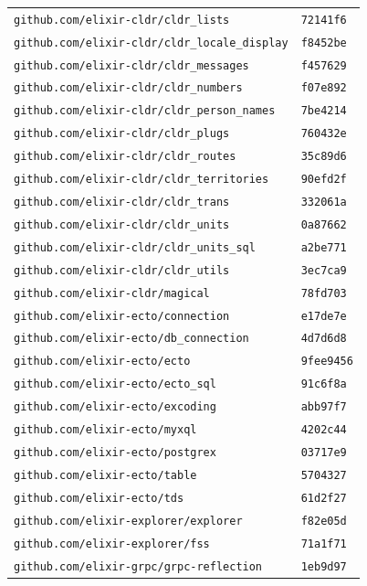 \begin{longtable}{@{}p{} l@{}}
\texttt{github.com/elixir-cldr/cldr\_lists} & \texttt{72141f6} \\
\texttt{github.com/elixir-cldr/cldr\_locale\_display} & \texttt{f8452be} \\
\texttt{github.com/elixir-cldr/cldr\_messages} & \texttt{f457629} \\
\texttt{github.com/elixir-cldr/cldr\_numbers} & \texttt{f07e892} \\
\texttt{github.com/elixir-cldr/cldr\_person\_names} & \texttt{7be4214} \\
\texttt{github.com/elixir-cldr/cldr\_plugs} & \texttt{760432e} \\
\texttt{github.com/elixir-cldr/cldr\_routes} & \texttt{35c89d6} \\
\texttt{github.com/elixir-cldr/cldr\_territories} & \texttt{90efd2f} \\
\texttt{github.com/elixir-cldr/cldr\_trans} & \texttt{332061a} \\
\texttt{github.com/elixir-cldr/cldr\_units} & \texttt{0a87662} \\
\texttt{github.com/elixir-cldr/cldr\_units\_sql} & \texttt{a2be771} \\
\texttt{github.com/elixir-cldr/cldr\_utils} & \texttt{3ec7ca9} \\
\texttt{github.com/elixir-cldr/magical} & \texttt{78fd703} \\
\texttt{github.com/elixir-ecto/connection} & \texttt{e17de7e} \\
\texttt{github.com/elixir-ecto/db\_connection} & \texttt{4d7d6d8} \\
\texttt{github.com/elixir-ecto/ecto} & \texttt{9fee9456} \\
\texttt{github.com/elixir-ecto/ecto\_sql} & \texttt{91c6f8a} \\
\texttt{github.com/elixir-ecto/excoding} & \texttt{abb97f7} \\
\texttt{github.com/elixir-ecto/myxql} & \texttt{4202c44} \\
\texttt{github.com/elixir-ecto/postgrex} & \texttt{03717e9} \\
\texttt{github.com/elixir-ecto/table} & \texttt{5704327} \\
\texttt{github.com/elixir-ecto/tds} & \texttt{61d2f27} \\
\texttt{github.com/elixir-explorer/explorer} & \texttt{f82e05d} \\
\texttt{github.com/elixir-explorer/fss} & \texttt{71a1f71} \\
\texttt{github.com/elixir-grpc/grpc-reflection} & \texttt{1eb9d97} \\

\end{longtable}
